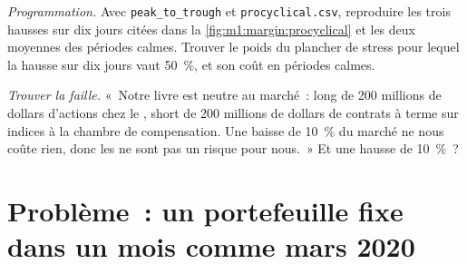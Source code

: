 \begin{exercise}[$\star\star\star$]\label{exo:m1:margin:7}
\emph{Programmation.} Avec \texttt{peak\_to\_trough} et \texttt{procyclical.csv},
reproduire les trois hausses sur dix jours citées dans
la \cref{fig:m1:margin:procyclical} et les deux moyennes des périodes calmes. Trouver le
poids du plancher de stress pour lequel la hausse sur dix jours vaut 50~\%, et son
coût en périodes calmes.
\end{exercise}

\begin{exercise}[$\star\star\star$]\label{exo:m1:margin:8}
\emph{Trouver la faille.} «~Notre livre est neutre au marché~: long de 200 millions de dollars
d'actions chez le , short de 200 millions de dollars de contrats à terme sur indices à la
chambre de compensation. Une baisse de 10~\% du marché ne nous coûte rien, donc les 
ne sont pas un risque pour nous.~» Et une hausse de 10~\%~?
\end{exercise}

\section{Problème~: un portefeuille fixe dans un mois comme mars 2020}

